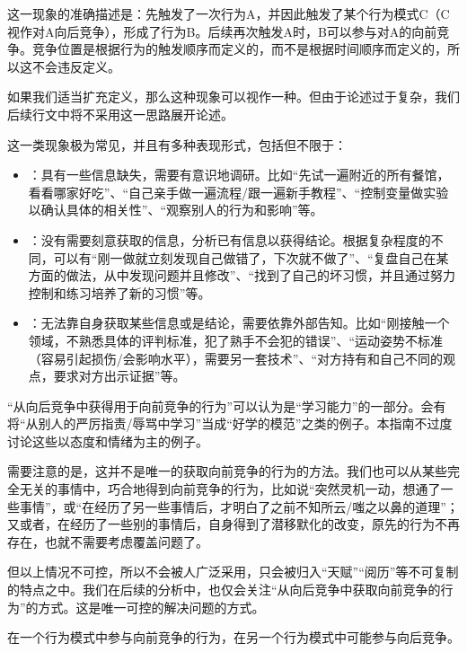 \begin{explain}
这一现象的准确描述是：先触发了一次行为A，并因此触发了某个行为模式C（C视作对A向后竞争），形成了行为B。后续再次触发A时，B可以参与对A的向前竞争。竞争位置是根据行为的触发顺序而定义的，而不是根据时间顺序而定义的，所以这不会违反定义。

如果我们适当扩充定义，那么这种现象可以视作一种。但由于论述过于复杂，我们后续行文中将不采用这一思路展开论述。

这一类现象极为常见，并且有多种表现形式，包括但不限于：
\begin{itemize}
\item {}：具有一些信息缺失，需要有意识地调研。比如“先试一遍附近的所有餐馆，看看哪家好吃”、“自己亲手做一遍流程/跟一遍新手教程”、“控制变量做实验以确认具体的相关性”、“观察别人的行为和影响”等。
\item {}：没有需要刻意获取的信息，分析已有信息以获得结论。根据复杂程度的不同，可以有“刚一做就立刻发现自己做错了，下次就不做了”、“复盘自己在某方面的做法，从中发现问题并且修改”、“找到了自己的坏习惯，并且通过努力控制和练习培养了新的习惯”等。
\item {}：无法靠自身获取某些信息或是结论，需要依靠外部告知。比如“刚接触一个领域，不熟悉具体的评判标准，犯了熟手不会犯的错误”、“运动姿势不标准（容易引起损伤/会影响水平），需要另一套技术”、“对方持有和自己不同的观点，要求对方出示证据”等。
\end{itemize}
“从向后竞争中获得用于向前竞争的行为”可以认为是“学习能力”的一部分。会有将“从别人的严厉指责/辱骂中学习”当成“好学的模范”之类的例子。本指南不过度讨论这些以态度和情绪为主的例子。

需要注意的是，这并不是唯一的获取向前竞争的行为的方法。我们也可以从某些完全无关的事情中，巧合地得到向前竞争的行为，比如说“突然灵机一动，想通了一些事情”，或“在经历了另一些事情后，才明白了之前不知所云/嗤之以鼻的道理”；又或者，在经历了一些别的事情后，自身得到了潜移默化的改变，原先的行为不再存在，也就不需要考虑覆盖问题了。

但以上情况不可控，所以不会被人广泛采用，只会被归入“天赋”“阅历”等不可复制的特点之中。我们在后续的分析中，也仅会关注“从向后竞争中获取向前竞争的行为”的方式。这是唯一可控的解决问题的方式。
\end{explain}
在一个行为模式中参与向前竞争的行为，在另一个行为模式中可能参与向后竞争。
